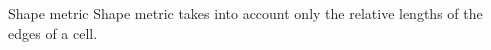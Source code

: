 \documentclass[t,12pt]{beamer}
\begin{document}
\begin{frame}{Shape metric}
Shape metric takes into account only the relative lengths of the edges of a cell.
 \begin{figure}
 	\centering
 	\hspace{0.2in}
 	\subfloat{
}
\end{figure}
\end{frame}
\end{document}
